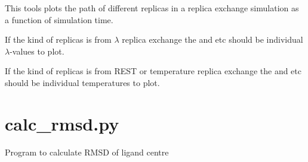\documentclass[letterpaper,10pt,english]{sphinxmanual}
\begin{document}
%
\begin{sphinxVerbatim}[commandchars=\\\{\}]
     
        
        
\end{sphinxVerbatim}


This tools plots the path of different replicas in a replica exchange simulation as a function of simulation time.

If the kind of replicas is from \(\lambda\) replica exchange the  and  etc should be individual \(\lambda\)-values to plot.

If the kind of replicas is from REST or temperature replica exchange the  and  etc should be individual temperatures to plot.


\section{calc\_rmsd.py}
\label{\detokenize{tools:calc-rmsd-py}}

Program to calculate RMSD of ligand centre


%
\begin{sphinxVerbatim}[commandchars=\\\{\}]
  \PYG{p}{[}\PYG{p}{]} \PYG{p}{[} \PYG{p}{]} \PYG{p}{[}  \PYG{p}{[} \PYG{p}{]}\PYG{p}{]} \PYG{p}{[} \PYG{p}{]}
                    \PYG{p}{[} \PYG{p}{]} \PYG{p}{[} \PYG{p}{]}
\end{sphinxVerbatim}
\end{document}
